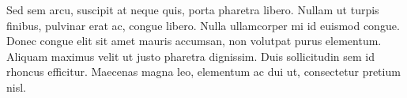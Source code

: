 Sed sem arcu, suscipit at neque quis, porta pharetra libero. Nullam ut turpis finibus, pulvinar erat ac, congue libero. Nulla ullamcorper mi id euismod congue. Donec congue elit sit amet mauris accumsan, non volutpat purus elementum. Aliquam maximus velit ut justo pharetra dignissim. Duis sollicitudin sem id rhoncus efficitur. Maecenas magna leo, elementum ac dui ut, consectetur pretium nisl.